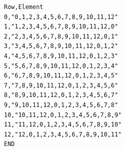 \begin{verbatim}
Row,Element
0,"0,1,2,3,4,5,6,7,8,9,10,11,12"
1,"1,2,3,4,5,6,7,8,9,10,11,12,0"
2,"2,3,4,5,6,7,8,9,10,11,12,0,1"
3,"3,4,5,6,7,8,9,10,11,12,0,1,2"
4,"4,5,6,7,8,9,10,11,12,0,1,2,3"
5,"5,6,7,8,9,10,11,12,0,1,2,3,4"
6,"6,7,8,9,10,11,12,0,1,2,3,4,5"
7,"7,8,9,10,11,12,0,1,2,3,4,5,6"
8,"8,9,10,11,12,0,1,2,3,4,5,6,7"
9,"9,10,11,12,0,1,2,3,4,5,6,7,8"
10,"10,11,12,0,1,2,3,4,5,6,7,8,9"
11,"11,12,0,1,2,3,4,5,6,7,8,9,10"
12,"12,0,1,2,3,4,5,6,7,8,9,10,11"
END
\end{verbatim}
